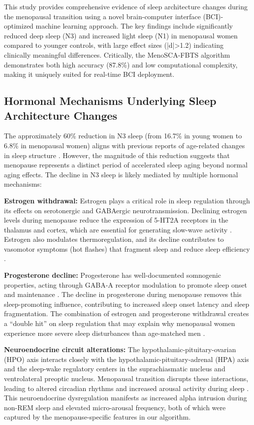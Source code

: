 \documentclass[a4paper,fleqn]{cas-dc}
\begin{document}
This study provides comprehensive evidence of sleep architecture changes during the menopausal transition using a novel brain-computer interface (BCI)-optimized machine learning approach. The key findings include significantly reduced deep sleep (N3) and increased light sleep (N1) in menopausal women compared to younger controls, with large effect sizes (|d|>1.2) indicating clinically meaningful differences. Critically, the MenoSCA-FBTS algorithm demonstrates both high accuracy (87.8\%) and low computational complexity, making it uniquely suited for real-time BCI deployment.

\subsection{Hormonal Mechanisms Underlying Sleep Architecture Changes}

The approximately 60\% reduction in N3 sleep (from 16.7\% in young women to 6.8\% in menopausal women) aligns with previous reports of age-related changes in sleep structure \cite{Ohayon2004}. However, the magnitude of this reduction suggests that menopause represents a distinct period of accelerated sleep aging beyond normal aging effects. The decline in N3 sleep is likely mediated by multiple hormonal mechanisms:

\textbf{Estrogen withdrawal:} Estrogen plays a critical role in sleep regulation through its effects on serotonergic and GABAergic neurotransmission. Declining estrogen levels during menopause reduce the expression of 5-HT2A receptors in the thalamus and cortex, which are essential for generating slow-wave activity \cite{PoloKantola1998}. Estrogen also modulates thermoregulation, and its decline contributes to vasomotor symptoms (hot flashes) that fragment sleep and reduce sleep efficiency \cite{Kronenberg1990, Freedman2004}.

\textbf{Progesterone decline:} Progesterone has well-documented somnogenic properties, acting through GABA-A receptor modulation to promote sleep onset and maintenance \cite{Manber2003}. The decline in progesterone during menopause removes this sleep-promoting influence, contributing to increased sleep onset latency and sleep fragmentation. The combination of estrogen and progesterone withdrawal creates a ``double hit'' on sleep regulation that may explain why menopausal women experience more severe sleep disturbances than age-matched men \cite{Baker2023}.

\textbf{Neuroendocrine circuit alterations:} The hypothalamic-pituitary-ovarian (HPO) axis interacts closely with the hypothalamic-pituitary-adrenal (HPA) axis and the sleep-wake regulatory centers in the suprachiasmatic nucleus and ventrolateral preoptic nucleus. Menopausal transition disrupts these interactions, leading to altered circadian rhythms and increased arousal activity during sleep \cite{Haufe2023}. This neuroendocrine dysregulation manifests as increased alpha intrusion during non-REM sleep and elevated micro-arousal frequency, both of which were captured by the menopause-specific features in our algorithm.
\end{document}
